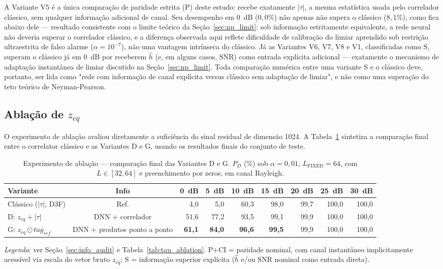 \documentclass[12pt,a4paper]{article}
\begin{document}
A Variante V5 é a única comparação de paridade estrita (P) deste estudo: recebe exatamente $|\tau|$, a mesma estatística usada pelo correlador clássico, sem qualquer informação adicional de canal. Seu desempenho em 0~dB ($0{,}0\%$) não apenas não supera o clássico ($8{,}1\%$), como fica abaixo dele --- resultado consistente com o limite teórico da Seção~\ref{sec:np_limit}: sob informação estritamente equivalente, a rede neural não deveria superar o correlador clássico, e a diferença observada aqui reflete dificuldade de calibração do limiar aprendido sob restrição ultraestrita de falso alarme ($\alpha=10^{-7}$), não uma vantagem intrínseca do clássico. Já as Variantes V6, V7, V8 e V1, classificadas como S, superam o clássico já em $0$~dB por receberem $\hat h$ (e, em alguns casos, $\overline{\text{SNR}}$) como entrada explícita adicional --- exatamente o mecanismo de adaptação instantânea de limiar discutido na Seção~\ref{sec:np_limit}. Toda comparação numérica entre uma variante S e o clássico deve, portanto, ser lida como "rede com informação de canal explícita versus clássico sem adaptação de limiar", e não como uma superação do teto teórico de Neyman-Pearson.

\subsection{Ablação de $z_{eq}$}\label{sec:ablation_zeq}

O experimento de ablação avaliou diretamente a suficiência do sinal residual de dimensão 1024. A Tabela~\ref{tab:zeq_ablation} sintetiza a comparação final entre o correlator clássico e as Variantes D e G, usando os resultados finais do conjunto de teste.

\begin{table}[htb]
\caption{\label{tab:zeq_ablation}Experimento de ablação --- comparação final das Variantes D e G. $P_D$ (\%) sob $\alpha=0{,}01$, $L_{\mathrm{FIXED}}=64$, com $L\in[32,64]$ e preenchimento por zeros, em canal Rayleigh.}
\begin{center}
{\footnotesize
\begin{tabular}{lcrrrrrrr}\toprule
Variante & Info & 0~dB & 5~dB & 10~dB & 15~dB & 20~dB & 25~dB & 30~dB \\\midrule
Clássico ($|\tau|$, D3F) & Ref. & 4{,}0 & 5{,}0 & 60{,}3 & 98{,}0 & 99{,}7 & 100{,}0 & 100{,}0 \\\midrule
D: $z_{eq}+|\tau|$ & DNN + correlador & 51{,}6 & 77{,}2 & 93{,}5 & 99{,}1 & 99{,}9 & 100{,}0 & 100{,}0 \\
G: $z_{eq}\odot tag_{ref}$ & DNN + produtos ponto a ponto & \textbf{61{,}1} & \textbf{84{,}0} & \textbf{96{,}6} & \textbf{99{,}5} & 99{,}9 & 100{,}0 & 100{,}0 \\
\bottomrule
\end{tabular}
}
\end{center}
\footnotesize\textit{Legenda}: ver Seção~\ref{sec:info_audit} e Tabela~\ref{tab:tau_ablation}. P+CI = paridade nominal, com canal instantâneo implicitamente acessível via escala do vetor bruto $z_{eq}$; S = informação superior explícita ($\hat h$ e/ou SNR nominal como entrada direta).
\end{table}
\end{document}
